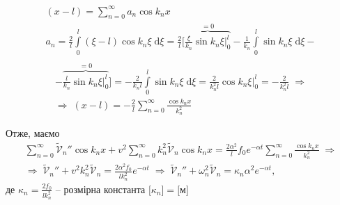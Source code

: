 \begin{equation*}
    \begin{gathered}
        (x-l) = \sum_{n=0}^\infty a_n \cos k_n x\\
        a_n = \frac{2}{l} \int\limits_0^l (\xi-l) \cos k_n\xi \;\mathrm{d}\xi =\frac{2}{l} \bigg[ \overbrace{\frac{\xi}{k_n} \sin k_n\xi \bigg|_0^l}^{=0} - \frac{1}{k_n} \int\limits_0^l \sin k_n\xi \;\mathrm{d}\xi -\\
    \end{gathered}
\end{equation*}
\begin{equation} \label{fourier-sum7,1}
    \begin{gathered}
        -\overbrace{\frac{l}{k_n}\sin k_n\xi \bigg|_0^l}^{=0}\bigg] = -\frac{2}{k_n l} \int\limits_0^l \sin k_n\xi \;\mathrm{d}\xi = \frac{2}{k_n^2 l} \cos k_n\xi \bigg|_0^l = -\frac{2}{k_n^2 l} 
        \;\Rightarrow \\
        \Rightarrow\; (x-l) = -\frac{2}{l}\sum_{n=0}^\infty \frac{\cos k_n x}{k_n^2}
    \end{gathered}
\end{equation}

Отже, маємо 
\begin{equation}
    \begin{gathered}
        \sum_{n=0}^\infty \widetilde{\mathcal{V}}_n'' \cos k_n x + v^2 \sum_{n=0}^\infty k_n^2 \widetilde{\mathcal{V}}_n \cos k_n x =  \frac{2 \alpha^2}{l} f_0 e^{-\alpha t} \sum_{n=0}^\infty \frac{\cos k_n x}{k_n^2} 
        \;\Rightarrow\\
        \Rightarrow\; 
        \widetilde{\mathcal{V}}_n'' + v^2 k_n^2 \widetilde{\mathcal{V}}_n = \frac{2\alpha^2f_0}{l k_n^2} e^{-\alpha t} 
        \;\Rightarrow\;
        \widetilde{\mathcal{V}}_n'' + \omega_n^2 \widetilde{\mathcal{V}}_n = \kappa_n\alpha^2 e^{-\alpha t}, 
    \end{gathered}
\end{equation}
де $\kappa_n = \frac{2f_0}{l k_n^2}$ -- розмірна константа $\big[\kappa_n\big] = \big[\text{м}\big]$

